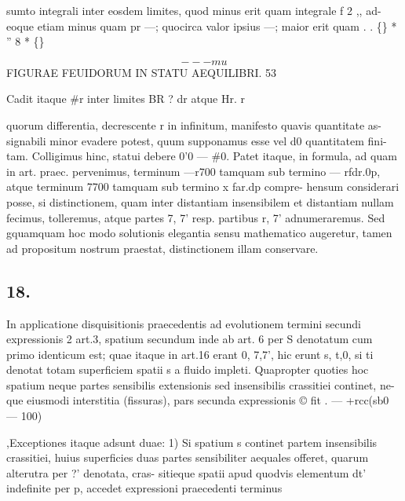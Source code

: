\documentclass[12pt,a4paper]{article}
\begin{document}
sumto integrali inter eosdem limites, quod minus erit quam integrale f 2                                       ,, ad-
eoque etiam minus quam pr  ---; quocirca valor ipsius ---; maior erit quam
.         .                             \textregistered\{\}              *   ''        8          *        \textregistered\{\}




\[                                                 ---       m    u\]
FIGURAE FEUIDORUM IN STATU AEQUILIBRI.                                 53

Cadit itaque \#r inter limites
BR     ?
dr atque      Hr.                      r

quorum differentia, decrescente r in infinitum, manifesto quavis quantitate as-
signabili minor evadere potest, quum supponamus esse vel d0 quantitatem fini-
tam.     Colligimus hinc, statui debere           0'0 --- \#0.        Patet itaque, in formula, ad
quam      in art. praec.     pervenimus,       terminum           ---r700      tamquam     sub termino
--- rfdr.0p,       atque terminum         7700     tamquam sub termino             x far.dp    compre-
hensum considerari posse, si distinctionem,                 quam    inter distantiam     insensibilem
et distantiam nullam fecimus, tolleremus, atque partes 7, 7' resp. partibus r, 7'
adnumeraremus. Sed gquamquam hoc modo solutionis elegantia sensu mathematico
augeretur, tamen ad propositum nostrum praestat, distinctionem illam conservare.


\subsection*{18.}

In applicatione disquisitionis praecedentis ad evolutionem termini secundi
expressionis 2 art.3,        spatium
secundum inde ab art. 6 per S denotatum cum
primo identicum est; quae itaque in art.16 erant 0, 7,7', hic erunt s, t,0, si
ti denotat totam superficiem spatii s a fluido impleti.                     Quapropter   quoties hoc
spatium neque partes sensibilis extensionis sed insensibilis crassitiei continet, ne-
que eiusmodi interstitia (fissuras), pars secunda expressionis © fit
.                                   --- +rcc(sb0 --- 100)

,Exceptiones itaque adsunt duae:
1) Si spatium s continet partem insensibilis crassitiei, huius superficies
duas partes sensibiliter aequales offeret, quarum alterutra per ?' denotata, cras-
sitieque spatii apud quodvis elementum dt' indefinite per p, accedet expressioni
praecedenti terminus
\end{document}
